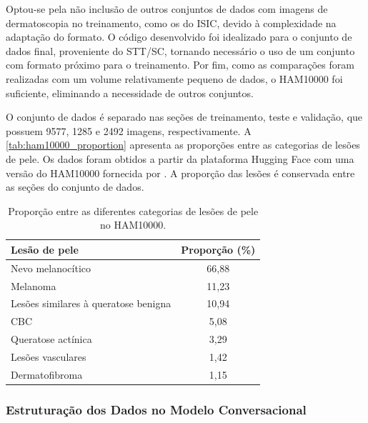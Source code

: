 Optou-se pela não inclusão de outros conjuntos de dados com imagens de dermatoscopia no treinamento, como os do
\ac{ISIC}, devido à complexidade na adaptação do formato. O código desenvolvido foi idealizado para o conjunto de dados
final, proveniente do \ac{STT/SC}, tornando necessário o uso de um conjunto com formato próximo para o treinamento. Por
fim, como as comparações foram realizadas com um volume relativamente pequeno de dados, o \ac{HAM10000} foi suficiente,
eliminando a necessidade de outros conjuntos.

O conjunto de dados é separado nas seções de treinamento, teste e validação, que possuem 9577, 1285 e 2492 imagens,
respectivamente. A \autoref{tab:ham10000_proportion} apresenta as proporções entre as categorias de lesões de pele. Os
dados foram obtidos a partir da plataforma Hugging Face com uma versão do \ac{HAM10000} fornecida por
\textcite{skin_cancer_dataset}. A proporção das lesões é conservada entre as seções do conjunto de dados.

\begin{table}[ht]
    \caption{\small Proporção entre as diferentes categorias de lesões de pele no \ac{HAM10000}.}
    \centering
    \begin{tabular}{l|c}
        \hline
        Lesão de pele                        & Proporção (\%) \\ \hline
        Nevo melanocítico                    & 66,88          \\
        Melanoma                             & 11,23          \\
        Lesões similares à queratose benigna & 10,94          \\
        \ac{CBC}                             & 5,08           \\
        Queratose actínica                   & 3,29           \\
        Lesões vasculares                    & 1,42           \\
        Dermatofibroma                       & 1,15           \\ \hline
    \end{tabular}
    \label{tab:ham10000_proportion}
\end{table}

\subsubsection{Estruturação dos Dados no Modelo Conversacional}

